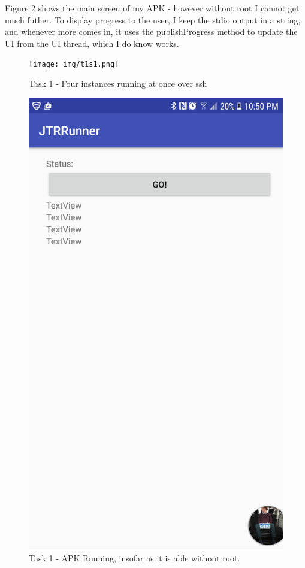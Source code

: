 \documentclass{article}
\begin{document}
Figure 2 shows the main screen of my APK - however without root I cannot get much futher. To display progress to the user, I keep the stdio output in a string, and whenever more comes in, it uses the publishProgress method to update the UI from the UI thread, which I do know works.

	\begin{figure}[ht]
        \centerline{
            \texttt{[image: img/t1s1.png]}
        }
		\centering
		\caption{Task 1 - Four instances running at once over ssh}
	\end{figure}
	\begin{figure}[ht]
        \centerline{
            \includegraphics[width=7.5in]{img/t1s2.png}
        }
		\centering
		\caption{Task 1 - APK Running, insofar as it is able without root.}
	\end{figure}
\end{document}
